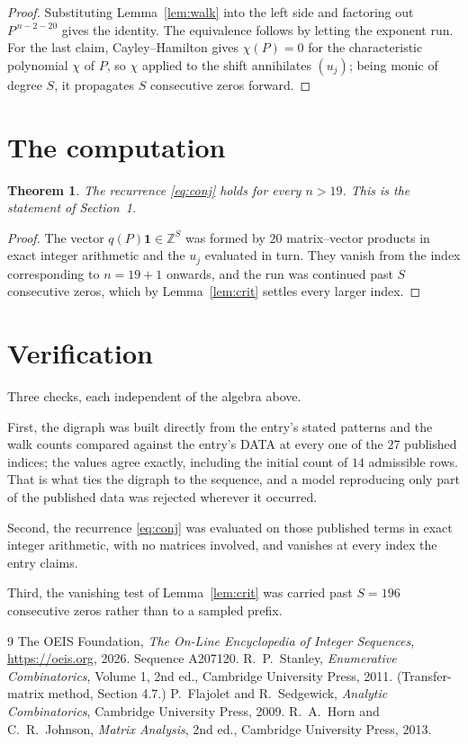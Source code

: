 \documentclass[11pt,a4paper]{article}
\theoremstyle{plain}
\newtheorem{theorem}{Theorem}
\theoremstyle{definition}
\begin{document}
\begin{proof}
Substituting Lemma~\ref{lem:walk} into the left side and factoring out
$P^{\,n-2-20}$ gives the identity. The equivalence follows by letting the exponent
run. For the last claim, Cayley--Hamilton gives $\chi(P)=0$ for the characteristic
polynomial $\chi$ of $P$, so $\chi$ applied to the shift annihilates $(u_j)$; being monic of
degree $S$, it propagates $S$ consecutive zeros forward.
\end{proof}

\section{The computation}

\begin{theorem}
The recurrence \eqref{eq:conj} holds for every $n>19$. This is the statement of
Section~1.
\end{theorem}

\begin{proof}
The vector $q(P)\mathbf{1}\in\mathbb{Z}^{S}$ was formed by $20$ matrix--vector
products in exact integer arithmetic and the $u_j$ evaluated in turn. They vanish from the
index corresponding to $n=19+1$ onwards, and the run was continued past $S$ consecutive
zeros, which by Lemma~\ref{lem:crit} settles every larger index.
\end{proof}

\section{Verification}

Three checks, each independent of the algebra above.

First, the digraph was built directly from the entry's stated patterns and the walk counts
compared against the entry's DATA at every one of the $27$ published indices; the
values agree exactly, including the initial count of $14$ admissible rows. That is
what ties the digraph to the sequence, and a model reproducing only part of the published
data was rejected wherever it occurred.

Second, the recurrence \eqref{eq:conj} was evaluated on those published terms in exact
integer arithmetic, with no matrices involved, and vanishes at every index the entry claims.

Third, the vanishing test of Lemma~\ref{lem:crit} was carried past $S=196$ consecutive
zeros rather than to a sampled prefix.

\begin{thebibliography}{9}
 The OEIS Foundation, \emph{The On-Line Encyclopedia of Integer
Sequences}, \url{https://oeis.org}, 2026. Sequence A207120.
 R.~P.~Stanley, \emph{Enumerative Combinatorics}, Volume 1, 2nd ed.,
Cambridge University Press, 2011. (Transfer-matrix method, Section 4.7.)
 P.~Flajolet and R.~Sedgewick, \emph{Analytic Combinatorics}, Cambridge
University Press, 2009.
 R.~A.~Horn and C.~R.~Johnson, \emph{Matrix Analysis}, 2nd ed., Cambridge
University Press, 2013.
\end{thebibliography}
\end{document}
